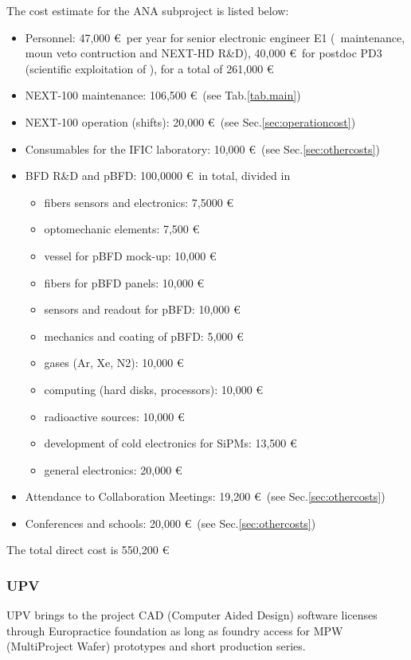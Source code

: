 The cost estimate for the ANA subproject is listed below:
\begin{itemize}
    \item Personnel: 47,000 \euro\ per year for senior electronic engineer E1 (\Next\ maintenance, moun veto contruction and NEXT-HD R\&D), 40,000 \euro\ for postdoc PD3 (scientific exploitation of \Next), for a total of 261,000 \euro  
    \item NEXT-100 maintenance: 106,500 \euro\ (see Tab.\ref{tab.main})
    \item NEXT-100 operation (shifts): 20,000 \euro\ (see Sec.\ref{sec:operationcost})
    \item Consumables for the IFIC laboratory: 10,000 \euro\ (see Sec.\ref{sec:othercosts})
    \item BFD R\&D and pBFD: 100,0000 \euro\ in total, divided in
        \begin{itemize}
            \item fibers sensors and electronics: 7,5000 \euro
            \item optomechanic elements: 7,500 \euro
            \item vessel for pBFD mock-up: 10,000 \euro
            \item fibers for pBFD panels: 10,000 \euro
            \item sensors and readout for pBFD: 10,000 \euro
            \item mechanics and coating of pBFD: 5,000 \euro
            \item gases (Ar, Xe, N2): 10,000 \euro
            \item computing (hard disks, processors): 10,000 \euro
            \item radioactive sources: 10,000 \euro
            \item development of cold electronics for SiPMs: 13,500 \euro
            \item general electronics: 20,000 \euro
        \end{itemize}
    \item Attendance to Collaboration Meetings: 19,200 \euro\ (see Sec.\ref{sec:othercosts})
    \item Conferences and schools: 20,000 \euro\ (see Sec.\ref{sec:othercosts})
\end{itemize}
The total direct cost is 550,200 \euro



\subsubsection{UPV}
UPV brings to the project CAD (Computer Aided Design) software licenses through Europractice foundation as long as foundry access for MPW (MultiProject Wafer) prototypes and short production series. 

